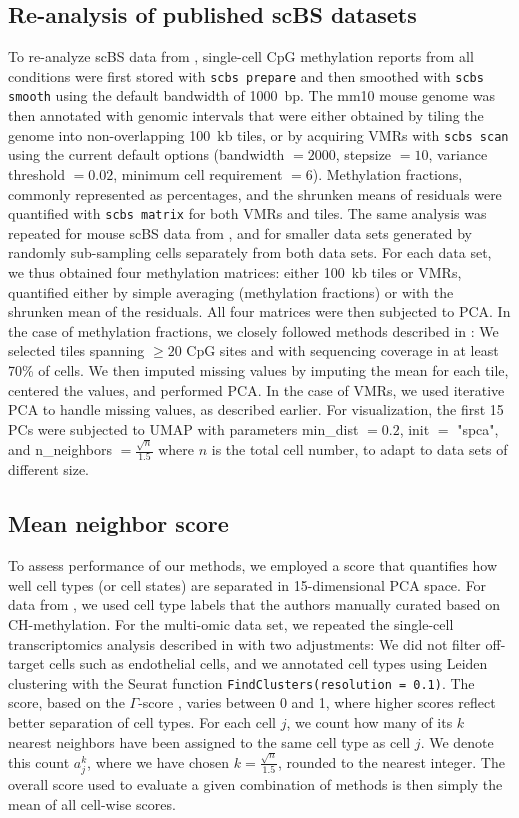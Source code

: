 \documentclass[twocolumn,10pt]{article}
\begin{document}
\subsection{Re-analysis of published scBS datasets}
To re-analyze scBS data from \citet{kremer_scnmt}, single-cell CpG methylation reports from all conditions were first stored with \texttt{scbs prepare} and then smoothed with \texttt{scbs smooth} using the default bandwidth of 1000~bp.
The mm10 mouse genome was then annotated with genomic intervals that were either obtained by tiling the genome into non-overlapping 100~kb tiles, or by acquiring VMRs with \texttt{scbs scan} using the current default options (bandwidth $=2000$, stepsize $=10$, variance threshold $= 0.02$, minimum cell requirement $=6$).
Methylation fractions, commonly represented as percentages, and the shrunken means of residuals were quantified with \texttt{scbs matrix} for both VMRs and tiles.
The same analysis was repeated for mouse scBS data from \citet{luo2017single}, and for smaller data sets generated by randomly sub-sampling cells separately from both data sets.
For each data set, we thus obtained four methylation matrices:
either 100~kb tiles or VMRs, quantified either by simple averaging (methylation fractions) or with the shrunken mean of the residuals.
All four matrices were then subjected to PCA.
In the case of methylation fractions, we closely followed methods described in \citet{luo2017single}:
We selected tiles spanning $\ge20$ CpG sites and with sequencing coverage in at least 70\% of cells.
We then imputed missing values by imputing the mean for each tile, centered the values, and performed PCA.
In the case of VMRs, we used iterative PCA to handle missing values, as described earlier.
For visualization, the first 15 PCs were subjected to UMAP with parameters min\_dist $=0.2$, init $=$ "spca", and n\_neighbors $=\frac{\sqrt{n}}{1.5}$ where $n$ is the total cell number, to adapt to data sets of different size.

\subsection{Mean neighbor score} \label{methods:score}
To assess performance of our methods, we employed a score that quantifies how well cell types (or cell states) are separated in 15-dimensional PCA space.
For data from \citet{luo2017single}, we used cell type labels that the authors manually curated based on CH-methylation.
For the multi-omic data set, we repeated the single-cell transcriptomics analysis described in \citet{kremer_scnmt} with two adjustments:
We did not filter off-target cells such as endothelial cells, and we annotated cell types using Leiden clustering with the Seurat \citep{seurat} function \texttt{FindClusters(resolution = 0.1)}.
The score, based on the $\Gamma$-score \citep{Kireeva_2014}, varies between 0 and 1, where higher scores reflect better separation of cell types.
For each cell $j$, we count how many of its $k$ nearest neighbors have been assigned to the same cell type as cell $j$.
We denote this count $a^k_j$, where we have chosen $k=\frac{\sqrt{n}}{1.5}$, rounded to the nearest integer.
The overall score used to evaluate a given combination of methods is then simply the mean of all cell-wise scores.
\end{document}
